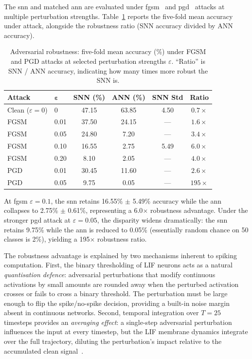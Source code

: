 The \gls{snn} and matched \gls{ann} are evaluated under \gls{fgsm}~\citep{goodfellow2015explaining} and \gls{pgd}~\citep{madry2018towards} attacks at multiple perturbation strengths. Table~\ref{tab:adversarial} reports the five-fold mean accuracy under attack, alongside the robustness ratio (SNN accuracy divided by ANN accuracy).

\begin{table}[t]
\centering
\caption{Adversarial robustness: five-fold mean accuracy (\%) under FGSM and PGD attacks at selected perturbation strengths $\varepsilon$. ``Ratio'' is SNN / ANN accuracy, indicating how many times more robust the SNN is.}
\label{tab:adversarial}
\small
\begin{tabular}{@{}llcccc@{}}
\toprule
\textbf{Attack} & $\boldsymbol{\varepsilon}$ & \textbf{SNN (\%)} & \textbf{ANN (\%)} & \textbf{SNN Std} & \textbf{Ratio} \\
\midrule
Clean ($\varepsilon = 0$) & 0 & 47.15 & 63.85 & 4.50 & $0.7\times$ \\
\midrule
FGSM & 0.01 & 37.50 & 24.15 & --- & $1.6\times$ \\
FGSM & 0.05 & 24.80 &  7.20 & --- & $3.4\times$ \\
FGSM & 0.10 & 16.55 &  2.75 & 5.49 & $6.0\times$ \\
FGSM & 0.20 &  8.10 &  2.05 & --- & $4.0\times$ \\
\midrule
PGD  & 0.01 & 30.45 & 11.60 & --- & $2.6\times$ \\
PGD  & 0.05 &  9.75 &  0.05 & --- & $195\times$ \\
\bottomrule
\end{tabular}
\end{table}

At \gls{fgsm} $\varepsilon = 0.1$, the \gls{snn} retains 16.55\% $\pm$ 5.49\% accuracy while the \gls{ann} collapses to 2.75\% $\pm$ 0.61\%, representing a 6.0$\times$ robustness advantage. Under the stronger \gls{pgd} attack at $\varepsilon = 0.05$, the disparity widens dramatically: the \gls{snn} retains 9.75\% while the \gls{ann} is reduced to 0.05\% (essentially random chance on 50 classes is 2\%), yielding a 195$\times$ robustness ratio.

The robustness advantage is explained by two mechanisms inherent to spiking computation. First, the binary thresholding of LIF neurons acts as a natural \emph{quantisation defence}: adversarial perturbations that modify continuous activations by small amounts are rounded away when the perturbed activation crosses or fails to cross a binary threshold. The perturbation must be large enough to flip the spike/no-spike decision, providing a built-in noise margin absent in continuous networks. Second, temporal integration over $T = 25$ timesteps provides an \emph{averaging effect}: a single-step adversarial perturbation influences the input at every timestep, but the LIF membrane dynamics integrate over the full trajectory, diluting the perturbation's impact relative to the accumulated clean signal~\citep{sharmin2020inherent}.

